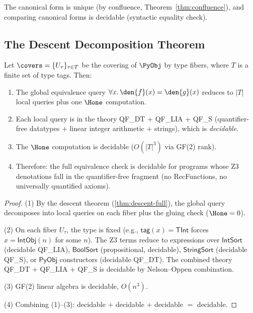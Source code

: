 The canonical form is unique (by confluence, Theorem~\ref{thm:confluence}),
and comparing canonical forms is decidable (syntactic equality check).

\subsection{The Descent Decomposition Theorem}

\begin{theorem}
\label{thm:descent-tractable}
Let $\covers = \{U_\tau\}_{\tau \in T}$ be the covering of
$\PyObj$ by type fibers, where $T$ is a finite set of type tags.
Then:
\begin{enumerate}
  \item The global equivalence query
    $\forall x.\, \den{f}(x) = \den{g}(x)$ reduces to
    $|T|$ local queries plus one $\Hone$ computation.
  \item Each local query is in the theory QF\_DT + QF\_LIA + QF\_S
    (quantifier-free datatypes + linear integer arithmetic + strings),
    which is \emph{decidable}.
  \item The $\Hone$ computation is decidable ($O(|T|^3)$ via GF(2)
    rank).
  \item Therefore: the full equivalence check is decidable for
    programs whose Z3 denotations fall in the quantifier-free
    fragment (no RecFunctions, no universally quantified axioms).
\end{enumerate}
\end{theorem}

\begin{proof}
(1) By the descent theorem (\ref{thm:descent-full}), the global query
decomposes into local queries on each fiber plus the gluing check
($\Hone = 0$).

(2) On each fiber $U_\tau$, the type is fixed (e.g., $\mathsf{tag}(x) =
\mathsf{TInt}$ forces $x = \mathsf{IntObj}(n)$ for some $n$).
The Z3 terms reduce to expressions over $\mathsf{IntSort}$
(decidable QF\_LIA), $\mathsf{BoolSort}$ (propositional, decidable),
$\mathsf{StringSort}$ (decidable QF\_S), or $\mathsf{PyObj}$ constructors
(decidable QF\_DT).  The combined theory QF\_DT + QF\_LIA + QF\_S
is decidable by Nelson--Oppen combination.

(3) GF(2) linear algebra is decidable, $O(n^3)$.

(4) Combining (1)--(3): decidable $+$ decidable $+$ decidable $=$
decidable.
\end{proof}

